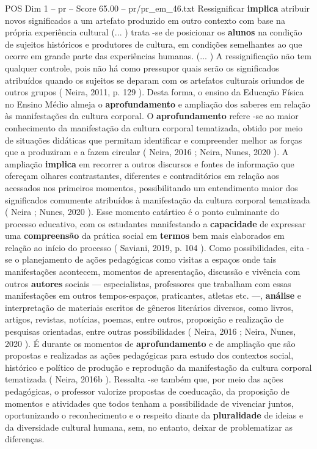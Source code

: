 \begin{textsample}{POS Dim 1 – pr – Score 65.00 – pr/pr\_em\_46.txt}
Ressignificar \textbf{implica} atribuir novos significados a um artefato produzido em outro contexto com base na própria experiência cultural (... ) trata -se de posicionar os \textbf{alunos} na condição de sujeitos históricos e produtores de cultura, em condições semelhantes ao que ocorre em grande parte das experiências humanas. (... ) A ressignificação não tem qualquer controle, pois não há como pressupor quais serão os significados atribuídos quando os sujeitos se deparam com os artefatos culturais oriundos de outros grupos ( Neira, 2011, p. 129 ).
Desta forma, o ensino da Educação Física no Ensino Médio almeja o \textbf{aprofundamento} e ampliação dos saberes em relação às manifestações da cultura corporal.
O \textbf{aprofundamento} refere -se ao maior conhecimento da manifestação da cultura corporal tematizada, obtido por meio de situações didáticas que permitam identificar e compreender melhor as forças que a produziram e a fazem circular ( Neira, 2016 ; Neira, Nunes, 2020 ).
A ampliação \textbf{implica} em recorrer a outros discursos e fontes de informação que ofereçam olhares contrastantes, diferentes e contraditórios em relação aos acessados nos primeiros momentos, possibilitando um entendimento maior dos significados comumente atribuídos à manifestação da cultura corporal tematizada ( Neira ; Nunes, 2020 ).
Esse momento catártico é o ponto culminante do processo educativo, com os estudantes manifestando a \textbf{capacidade} de expressar uma \textbf{compreensão} da prática social em \textbf{termos} bem mais elaborados em relação ao início do processo ( Saviani, 2019, p. 104 ).
Como possibilidades, cita -se o planejamento de ações pedagógicas como visitas a espaços onde tais manifestações acontecem, momentos de apresentação, discussão e vivência com outros \textbf{autores} sociais — especialistas, professores que trabalham com essas manifestações em outros tempos-espaços, praticantes, atletas etc. —, \textbf{análise} e interpretação de materiais escritos de gêneros literários diversos, como livros, artigos, revistas, notícias, poemas, entre outros, proposição e realização de pesquisas orientadas, entre outras possibilidades ( Neira, 2016 ; Neira, Nunes, 2020 ).
É durante os momentos de \textbf{aprofundamento} e de ampliação que são propostas e realizadas as ações pedagógicas para estudo dos contextos social, histórico e político de produção e reprodução da manifestação da cultura corporal tematizada ( Neira, 2016b ).
Ressalta -se também que, por meio das ações pedagógicas, o professor valorize propostas de coeducação, da proposição de momentos e atividades que todos tenham a possibilidade de vivenciar juntos, oportunizando o reconhecimento e o respeito diante da \textbf{pluralidade} de ideias e da diversidade cultural humana, sem, no entanto, deixar de problematizar as diferenças.

\end{textsample}
